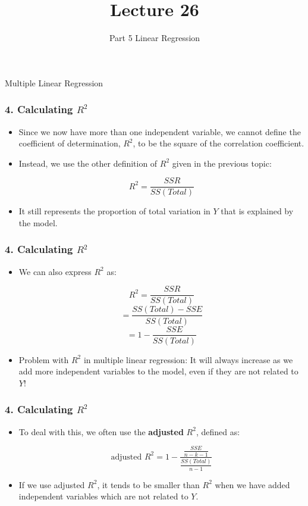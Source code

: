 \documentclass[14pt]{beamer}
\title[ECON2843]{Lecture 26}
\subtitle{Part 5 Linear Regression}
\date{}
\begin{document}
	\begin{frame}
		\titlepage
		
	\end{frame}
	\begin{frame}
		\vspace{1cm}
		\centering
		{\color{blue}\large Multiple Linear Regression}
	\end{frame}
	\begin{frame}
		\frametitle{4. Calculating $R^2$}
		
		\begin{itemize}[label={\color{blue}$\blacktriangleright$}]
			\item Since we now have more than one independent variable, we cannot define the coefficient of determination, $R^2$, to be the square of the correlation coefficient.
			
			\item Instead, we use the other definition of $R^2$ given in the previous topic:
			
			\[
			R^2 = \frac{SSR}{SS(Total)}
			\]
			
			\item It still represents the proportion of total variation in $Y$ that is explained by the model.
		\end{itemize}
		
	\end{frame}
\begin{frame}
	\frametitle{4. Calculating $R^2$}
	
	\begin{itemize}[label={\color{blue}$\blacktriangleright$}]
		\item We can also express $R^2$ as:
		
		\[
		R^2 = \frac{SSR}{SS(Total)}
		\]
		\[
		= \frac{SS(Total) - SSE}{SS(Total)}
		\]
		\[
		= 1 - \frac{SSE}{SS(Total)}
		\]
		
		\item Problem with $R^2$ in multiple linear regression: It will always increase as we add more independent variables to the model, even if they are not related to $Y$!
	\end{itemize}
	
\end{frame}
\begin{frame}
	\frametitle{4. Calculating $R^2$}
	
	\begin{itemize}[label={\color{blue}$\blacktriangleright$}]
		\item To deal with this, we often use the \textbf{adjusted} $R^2$, defined as:
		
		\[
		\text{adjusted }R^2 = 1 - \frac{\frac{SSE}{n-k-1}}{\frac{SS(Total)}{n-1}}
		\]
		
		\item If we use adjusted $R^2$, it tends to be smaller than $R^2$ when we have added independent variables which are not related to $Y$.
	\end{itemize}
	
\end{frame}
\end{document}
